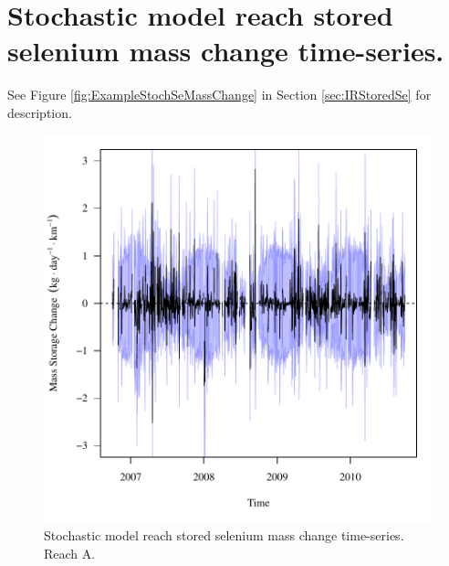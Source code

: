 \section{Stochastic model reach stored selenium mass change time-series.}
\label{App:SeS-S}

See Figure \ref{fig:ExampleStochSeMassChange} in Section \ref{sec:IRStoredSe} for description.

\begin{figure}[htbp]
	\begin{center}
	\includegraphics[width=6in]{"Figures/Results_USR/f Segment A"}
	\caption{Stochastic model reach stored selenium mass change time-series.  Reach A.}
	\end{center}
\end{figure}

